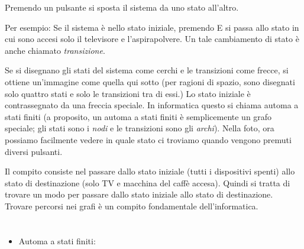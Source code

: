 {{Premendo un pulsante si sposta il sistema da uno stato all’altro.

Per esempio: Se il sistema è nello stato iniziale, premendo E si passa allo stato in cui sono accesi solo il televisore e l’aspirapolvere. Un tale cambiamento di stato è anche chiamato \emph{transizione}.

Se si disegnano gli stati del sistema come cerchi e le transizioni come frecce, si ottiene un’immagine come quella qui sotto (per ragioni di spazio, sono disegnati solo quattro stati e solo le transizioni tra di essi.) Lo stato iniziale è contrassegnato da una freccia speciale. In informatica questo si chiama automa a stati finiti (a proposito, un automa a stati finiti è semplicemente un grafo speciale; gli stati sono i \emph{nodi} e le transizioni sono gli \emph{archi}). Nella foto, ora possiamo facilmente vedere in quale stato ci troviamo quando vengono premuti diversi pulsanti.

{\centering%
\par}

Il compito consiste nel passare dallo stato iniziale (tutti i dispositivi spenti) allo stato di destinazione (solo TV e macchina del caffè accesa). Quindi si tratta di trovare un modo per passare dallo stato iniziale allo stato di destinazione. Trovare percorsi nei grafi è un compito fondamentale dell’informatica.



\section*{\BrochureWebsitesAndKeywords}
{\raggedright
\begin{itemize}
  \item Automa a stati finiti: \href{https://it.wikipedia.org/wiki/Automa_a_stati_finiti}{}
\end{itemize}


}

}{}

}
